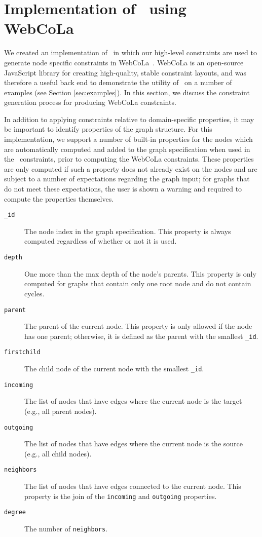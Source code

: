 \section{Implementation of \projectname~using WebCoLa}
We created an implementation of \projectname~in which our high-level constraints are used to generate node specific constraints in WebCoLa~\cite{WebCoLa}. WebCoLa is an open-source JavaScript library for creating high-quality, stable constraint layouts, and was therefore a useful back end to demonstrate the utility of \projectname~on a number of examples (see Section \ref{sec:examples}). In this section, we discuss the constraint generation process for producing WebCoLa constraints.


In addition to applying constraints relative to domain-specific properties, it may be important to identify properties of the graph structure. For this implementation, we support a number of built-in properties for the nodes which are automatically computed and added to the graph specification when used in the \projectname~constraints, prior to computing the WebCoLa constraints. These properties are only computed if such a property does not already exist on the nodes and are subject to a number of expectations regarding the graph input; for graphs that do not meet these expectations, the user is shown a warning and required to compute the properties themselves.

\begin{description}
\item[\texttt{\_id}] The node index in the graph specification. This property is always computed regardless of whether or not it is used.
\item[\texttt{depth}] One more than the max depth of the node's parents. This property is only computed for graphs that contain only one root node and do not contain cycles.
\item[\texttt{parent}] The parent of the current node. This property is only allowed if the node has one parent; otherwise, it is defined as the parent with the smallest \texttt{\_id}.
\item[\texttt{firstchild}] The child node of the current node with the smallest \texttt{\_id}.
\item[\texttt{incoming}] The list of nodes that have edges where the current node is the target (e.g., all parent nodes).
\item[\texttt{outgoing}] The list of nodes that have edges where the current node is the source (e.g., all child nodes).
\item[\texttt{neighbors}] The list of nodes that have edges connected to the current node. This property is the join of the \texttt{incoming} and \texttt{outgoing} properties.
\item[\texttt{degree}] The number of \texttt{neighbors}.
\end{description}
